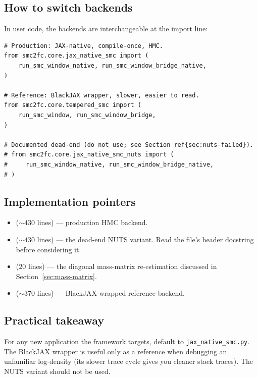 \subsection{How to switch backends}

In user code, the backends are interchangeable at the import line:

\begin{lstlisting}
# Production: JAX-native, compile-once, HMC.
from smc2fc.core.jax_native_smc import (
    run_smc_window_native, run_smc_window_bridge_native,
)

# Reference: BlackJAX wrapper, slower, easier to read.
from smc2fc.core.tempered_smc import (
    run_smc_window, run_smc_window_bridge,
)

# Documented dead-end (do not use; see Section ref{sec:nuts-failed}).
# from smc2fc.core.jax_native_smc_nuts import (
#     run_smc_window_native, run_smc_window_bridge_native,
# )
\end{lstlisting}

\subsection{Implementation pointers}

\begin{itemize}
  \item {} ($\sim 430$ lines) ---
        production HMC backend.
  \item {} ($\sim 430$ lines)
        --- the dead-end NUTS variant. Read the file's header
        docstring before considering it.
  \item {} ($20$ lines) --- the diagonal
        mass-matrix re-estimation discussed in Section~\ref{sec:mass-matrix}.
  \item {} ($\sim 370$ lines) ---
        BlackJAX-wrapped reference backend.
\end{itemize}

\subsection{Practical takeaway}

For any new application the framework targets, default to
\texttt{jax\_native\_smc.py}. The BlackJAX wrapper is useful only as
a reference when debugging an unfamiliar log-density (its slower
trace cycle gives you cleaner stack traces). The NUTS variant should
not be used.
